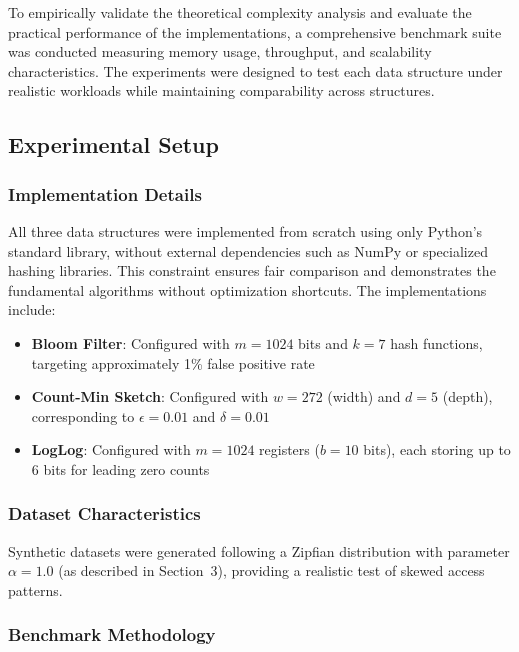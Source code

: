 To empirically validate the theoretical complexity analysis and evaluate the practical performance of the implementations, a comprehensive benchmark suite was conducted measuring memory usage, throughput, and scalability characteristics. The experiments were designed to test each data structure under realistic workloads while maintaining comparability across structures.

\subsection{Experimental Setup}

\subsubsection{Implementation Details}

All three data structures were implemented from scratch using only Python's standard library, without external dependencies such as NumPy or specialized hashing libraries. This constraint ensures fair comparison and demonstrates the fundamental algorithms without optimization shortcuts. The implementations include:

\begin{itemize}
    \item \textbf{Bloom Filter}: Configured with $m = 1024$ bits and $k = 7$ hash functions, targeting approximately 1\% false positive rate
    \item \textbf{Count-Min Sketch}: Configured with $w = 272$ (width) and $d = 5$ (depth), corresponding to $\epsilon = 0.01$ and $\delta = 0.01$
    \item \textbf{LogLog}: Configured with $m = 1024$ registers ($b = 10$ bits), each storing up to 6 bits for leading zero counts
\end{itemize}

\subsubsection{Dataset Characteristics}

Synthetic datasets were generated following a Zipfian distribution with parameter $\alpha = 1.0$ (as described in Section~3), providing a realistic test of skewed access patterns.

\subsubsection{Benchmark Methodology}

